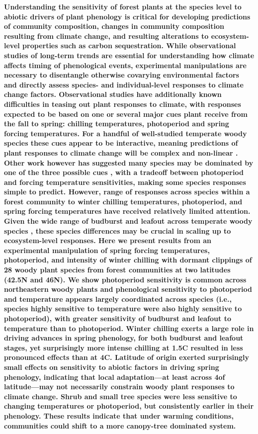 \documentclass{article}
\begin{document}
\textbf{Understanding the sensitivity of forest plants at the species level to abiotic drivers of plant phenology is critical for developing predictions of community composition, changes in community composition resulting from climate change, and resulting alterations to ecosystem-level properties such as carbon sequestration.  While observational studies of long-term trends are essential for understanding how climate affects timing of phenological events, experimental manipulations are necessary to disentangle otherwise covarying environmental factors and directly assess species- and individual-level responses to climate change factors. Observational studies have additionally known difficulties in teasing out plant responses to climate, with responses expected to be based on one or several major cues plant receive from the fall to spring: chilling temperatures, photoperiod and spring forcing temperatures. For a handful of well-studied temperate woody species these cues appear to be interactive, meaning predictions of plant responses to climate change will be complex and non-linear \cite{Chuine:1999aa}. Other work however has suggested many species may be dominated by one of the three possible cues \cite{Korner:2010}, with a tradeoff between photoperiod and forcing temperature sensitivities, making some species responses simple to predict. However, range of responses across species within a forest community to winter chilling temperatures, photoperiod, and spring forcing temperatures have received relatively limited attention. Given the wide range of budburst and leafout across temperate woody species \cite{Polgar:2011aa}, these species differences may be crucial in scaling up to ecosystem-level responses. Here we present results from an experimental manipulation of spring forcing temperatures, photoperiod, and intensity of winter chilling with dormant clippings of 28 woody plant species from forest communities at two latitudes (42.5\degree N and 46\degree N). We show photoperiod sensitivity is common across northeastern woody plants and phenological sensitivity to photoperiod and temperature appears largely coordinated across species (i.e., species highly sensitive to temperature were also highly sensitive to photoperiod), with greater sensitivity of budburst and leafout to temperature than to photoperiod. Winter chilling exerts a large role in driving advances in spring phenology, for both budburst and leafout stages, yet surprisingly more intense chilling at 1.5\degree C resulted in less pronounced effects than at 4\degree C. Latitude of origin exerted surprisingly small effects on sensitivity to abiotic factors in driving spring phenology, indicating that local adaptation---at least across 4\degree of latitude---may not necessarily constrain woody plant responses to climate change. Shrub and small tree species were less sensitive to changing temperatures or photoperiod, but consistently earlier in their phenology. These results indicate that under warming conditions, communities could shift to a more canopy-tree dominated system.
}
\end{document}
